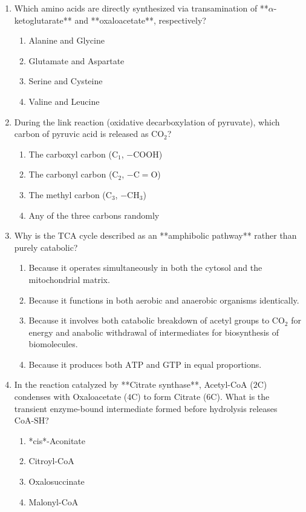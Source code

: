 \documentclass[11pt, a4paper]{article}
\begin{document}
\begin{enumerate}[label=\textbf{\arabic*.}]
\item Which amino acids are directly synthesized via transamination of **$\alpha$-ketoglutarate** and **oxaloacetate**, respectively?
\begin{enumerate}[label=(\Alph*)]
    \item Alanine and Glycine
    \item Glutamate and Aspartate
    \item Serine and Cysteine
    \item Valine and Leucine
\end{enumerate}

\item During the link reaction (oxidative decarboxylation of pyruvate), which carbon of pyruvic acid is released as $\text{CO}_2$?
\begin{enumerate}[label=(\Alph*)]
    \item The carboxyl carbon ($\text{C}_1$, $-\text{COOH}$)
    \item The carbonyl carbon ($\text{C}_2$, $-\text{C}=\text{O}$)
    \item The methyl carbon ($\text{C}_3$, $-\text{CH}_3$)
    \item Any of the three carbons randomly
\end{enumerate}

\item Why is the TCA cycle described as an **amphibolic pathway** rather than purely catabolic?
\begin{enumerate}[label=(\Alph*)]
    \item Because it operates simultaneously in both the cytosol and the mitochondrial matrix.
    \item Because it functions in both aerobic and anaerobic organisms identically.
    \item Because it involves both catabolic breakdown of acetyl groups to $\text{CO}_2$ for energy and anabolic withdrawal of intermediates for biosynthesis of biomolecules.
    \item Because it produces both $\text{ATP}$ and $\text{GTP}$ in equal proportions.
\end{enumerate}

\item In the reaction catalyzed by **Citrate synthase**, Acetyl-CoA ($2\text{C}$) condenses with Oxaloacetate ($4\text{C}$) to form Citrate ($6\text{C}$). What is the transient enzyme-bound intermediate formed before hydrolysis releases $\text{CoA-SH}$?
\begin{enumerate}[label=(\Alph*)]
    \item *cis*-Aconitate
    \item Citroyl-CoA
    \item Oxalosuccinate
    \item Malonyl-CoA
\end{enumerate}


\end{enumerate}
\end{document}
